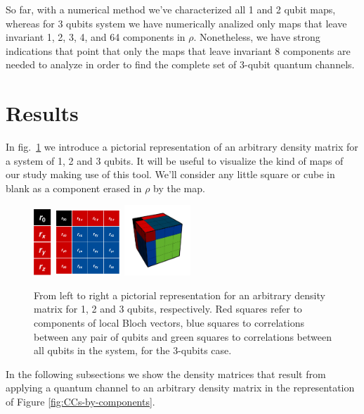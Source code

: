 \documentclass[11pt,dvipsnames]{article} %
\newcommand{\fref}[1]{fig.~\ref{#1}}  \newcommand{\tref}[1]{table~\ref{#1}}
\newcommand{\1}{\mathds{1}}
\begin{document}
So far, with a numerical method we've characterized all 1 and 2 qubit maps, 
whereas for 3 qubits system we have numerically analized only maps that leave 
invariant 1, 2, 3, 4, and 64 components in $\rho$. Nonetheless, we have strong
indications that point that only the maps that leave invariant 8 components are 
needed to analyze in order to find the complete set of 3-qubit quantum 
channels.
\section*{Results} %
In \fref{fig:pictorial-rep-rho} we introduce a pictorial representation 
of an arbitrary density matrix for a system of 1, 2 and 3 qubits. It 
will be useful to visualize the kind of maps of our study making use
of this tool. We'll consider any little square or cube in blank
as a component erased in $\rho$ by the map.
\begin{figure}[H] %
	\centering
	\hfill \hfill
	\includegraphics[height=2.5cm]
	{img/tablero-1q}
	\hfill
	\includegraphics[width=2.5cm]
	{img/rho2q(2)}
	\hfill 
	\includegraphics[width=2.5cm]
	{img/rho-3q}
	\hfill \hfill
	\caption{From left to right a pictorial representation for an arbitrary
	density matrix for 1, 2 and 3 qubits, respectively. 
	Red squares refer to components of local Bloch vectors,
	blue squares to correlations between any pair of qubits and
	green squares to correlations between all qubits in the system, for
	the 3-qubits case.}
	\label{fig:pictorial-rep-rho}
\end{figure} %
In the following subsections we show the density matrices that result from
applying a quantum channel to an arbitrary density matrix in the representation
of Figure \ref{fig:CCs-by-components}.
\end{document}
